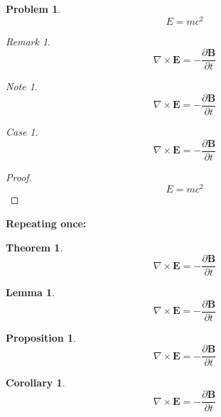 \documentclass[english,oneside, article]{memoir}
\theoremstyle{plain}
\newtheorem{Theorem}{Theorem}[chapter]
\newtheorem*{Lemma}{Lemma}
\newtheorem*{Proposition}{Proposition}
\newtheorem*{Corollary}{Corollary}
\theoremstyle{definition}
\newtheorem{Problem}{Problem}[chapter]
\theoremstyle{remark}
\newtheorem{Case}{Case}[chapter]
\newtheorem*{Remark}{Remark}
\newtheorem*{Note}{Note}
\begin{document}
\begin{Problem}

\[E=mc^2\]

\end{Problem}

\begin{Remark}

\[\nabla \times \mathbf{E} = - \frac{\partial \mathbf{B}}{\partial t}\]

\end{Remark}

\begin{Note}

\[\nabla \times \mathbf{E} = - \frac{\partial \mathbf{B}}{\partial t}\]

\end{Note}

\begin{Case}

\[\nabla \times \mathbf{E} = - \frac{\partial \mathbf{B}}{\partial t}\]

\end{Case}

\begin{proof}

\[E=mc^2\]

\end{proof}

\textbf{Repeating once:}

\begin{Theorem}

\[\nabla \times \mathbf{E} = - \frac{\partial \mathbf{B}}{\partial t}\]

\end{Theorem}

\begin{Lemma}

\[\nabla \times \mathbf{E} = - \frac{\partial \mathbf{B}}{\partial t}\]

\end{Lemma}

\begin{Proposition}

\[\nabla \times \mathbf{E} = - \frac{\partial \mathbf{B}}{\partial t}\]

\end{Proposition}

\begin{Corollary}

\[\nabla \times \mathbf{E} = - \frac{\partial \mathbf{B}}{\partial t}\]

\end{Corollary}
\end{document}
